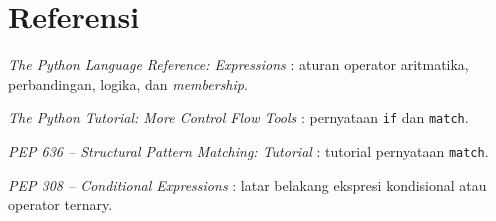 \section*{Referensi}
\begin{daftarrapat}
  \item \textit{The Python Language Reference: Expressions} \cite{py-ref-expressions}: aturan operator aritmatika, perbandingan, logika, dan \textit{membership}.
  \item \textit{The Python Tutorial: More Control Flow Tools} \cite{py-tut-controlflow}: pernyataan \texttt{if} dan \texttt{match}.
  \item \textit{PEP 636 – Structural Pattern Matching: Tutorial} \cite{pep636}: tutorial pernyataan \texttt{match}.
  \item \textit{PEP 308 – Conditional Expressions} \cite{pep308}: latar belakang ekspresi kondisional atau operator ternary.
\end{daftarrapat}

